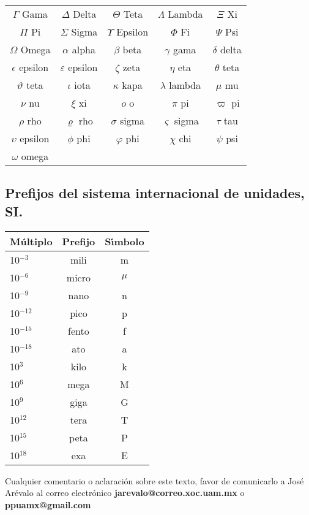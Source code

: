 \documentclass[letterpaper,spanish,12pt]{article}
\begin{document}
\begin{center}
\begin{tabular}{ccccc}
 $\Gamma     $ Gama&
 $\Delta     $ Delta&
 $\Theta     $ Teta&
 $\Lambda    $ Lambda&
 $\Xi        $ Xi \\ 
 $\Pi        $ Pi&
 $\Sigma     $ Sigma&
 $\Upsilon   $ Epsilon&
 $\Phi       $ Fi&
 $\Psi       $ Psi \\
 $\Omega     $ Omega & 
 $\alpha     $ alpha &
 $\beta      $ beta&
 $\gamma     $ gama &
 $\delta     $ delta \\
 $\epsilon   $ epsilon &
 $\varepsilon$ epsilon&
 $\zeta      $ zeta&
 $\eta       $ eta&
 $\theta     $ teta \\
 $\vartheta  $ teta &
 $\iota      $ iota &
 $\kappa     $ kapa& 
 $\lambda    $ lambda&
 $\mu        $ mu \\
 $\nu        $ nu &
 $\xi        $ xi&
 $o          $ o&
 $\pi        $ pi&
 $\varpi     $ pi \\
 $\rho       $ rho&
 $\varrho    $ rho&
 $\sigma     $ sigma &
 $\varsigma  $ sigma&
 $\tau       $ tau \\
 $\upsilon   $ epsilon&
 $\phi       $ phi&
 $\varphi    $ phi&
 $\chi       $ chi&
 $\psi       $ psi \\
 $\omega     $ omega &
 $        $ &
 $        $ &
 $        $ &
 $        $ \\
\end{tabular}
\end{center}
\vspace{0.5cm}


\subsection*{Prefijos del sistema internacional de unidades, SI.}

\vspace{0.5cm}
\begin{center}
\begin{tabular}{lcc}
M\'{u}ltiplo & Prefijo & S\'{\i}mbolo \\ \hline
10$^{-3}$ & mili & m \\ 
10$^{-6}$ & micro & $\mu$ \\
10$^{-9}$ & nano & n \\  
10$^{-12}$ & pico & p \\ 
10$^{-15}$ & fento & f \\ 
10$^{-18}$ & ato & a \\ \hline \hline
10$^{3}$ & kilo & k \\ 
10$^{6}$ & mega & M\\   
10$^{9}$ & giga & G\\   
10$^{12}$ & tera & T \\   
10$^{15}$ & peta & P\\   
10$^{18}$ & exa & E \\ \hline
\end{tabular}
\end{center}
\vfill


Cualquier comentario o aclaraci\'{o}n sobre este texto, favor de
comunicarlo a Jos\'{e} Ar\'{e}valo al correo electr\'{o}nico
\textbf{jarevalo@correo.xoc.uam.mx} o \textbf{ppuamx@gmail.com}
\end{document}
